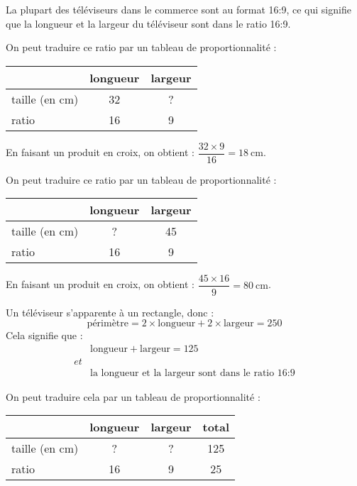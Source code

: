 \documentclass[../Cours.tex]{subfiles}
\begin{document}
\begin{questions}
    La plupart des téléviseurs dans le commerce sont au format 16:9, ce qui signifie que la longueur et la largeur du téléviseur sont dans le ratio 16:9.

    \question 
    On peut traduire ce ratio par un tableau de proportionnalité : 
    \begin{center}
        \begin{tabularx}{0.5\linewidth}{|l|C|C|}
             & longueur & largeur \\\hline
            taille (en \unit{\centi\metre}) & 32 & ? \\\hline
            ratio & 16 & 9 \\\hline
        \end{tabularx}
    \end{center}

    En faisant un produit en croix, on obtient : $\dfrac{32 \times 9 }{16} = \qty{18}{\centi\metre}$.

    \question 
    On peut traduire ce ratio par un tableau de proportionnalité : 
    \begin{center}
        \begin{tabularx}{0.5\linewidth}{|l|C|C|}
             & longueur & largeur \\\hline
            taille (en \unit{\centi\metre}) & ? & 45 \\\hline
            ratio & 16 & 9 \\\hline
        \end{tabularx}
    \end{center}

    En faisant un produit en croix, on obtient : $\dfrac{45 \times 16 }{9} = \qty{80}{\centi\metre}$.

    \question Un téléviseur s'apparente à un rectangle, donc : 
    $$\mbox{périmètre} = 2 \times \mbox{longueur} + 2 \times \mbox{largeur} = 250$$
    Cela signifie que : 
    \begin{align*}
        &\mbox{longueur} + \mbox{largeur} = 125 \\
        et& \\
        &\mbox{la longueur et la largeur sont dans le ratio 16:9}
    \end{align*}

    On peut traduire cela par un tableau de proportionnalité : 
    \begin{center}
        \begin{tabularx}{0.5\linewidth}{|l|C|C|C|}
             & longueur & largeur & total \\\hline
            taille (en \unit{\centi\metre}) & ? & ? & 125 \\\hline
            ratio & 16 & 9 & 25\\\hline
        \end{tabularx}
    \end{center}


\end{questions}
\end{document}
